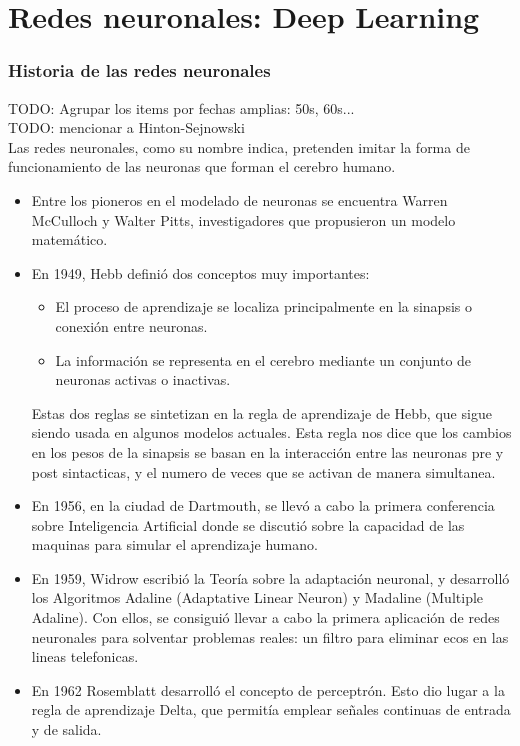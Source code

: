 \chapter{Redes neuronales: Deep Learning}
\subsection {Historia de las redes neuronales}
TODO: Agrupar los items por fechas amplias: 50s, 60s...\\
TODO: mencionar a Hinton-Sejnowski\\
Las redes neuronales, como su nombre indica, pretenden imitar la forma de funcionamiento de las neuronas que forman el cerebro humano.
\begin{itemize}
\item Entre los pioneros en el modelado de neuronas se encuentra Warren McCulloch y Walter Pitts, investigadores que propusieron un modelo matemático.
\item En 1949, Hebb definió dos conceptos muy importantes:
\begin{itemize}
\item El proceso de aprendizaje se localiza principalmente en la sinapsis o conexión entre neuronas.
\item La información se representa en el cerebro mediante un conjunto de neuronas activas o inactivas.
\end{itemize}
Estas dos reglas se sintetizan en la regla de aprendizaje de Hebb, que sigue siendo usada en algunos modelos actuales. Esta regla nos dice que los cambios en los pesos de la sinapsis se basan en la interacción entre las neuronas pre y post sintacticas, y el numero de veces que se activan de manera simultanea.
\item En 1956, en la ciudad de Dartmouth, se llevó a cabo la primera conferencia sobre Inteligencia Artificial donde se discutió sobre la capacidad de las maquinas para simular el aprendizaje humano.
\item En 1959, Widrow escribió la Teoría sobre la adaptación neuronal, y desarrolló los Algoritmos Adaline (Adaptative Linear Neuron) y Madaline (Multiple Adaline). Con ellos, se consiguió llevar a cabo la primera aplicación de redes neuronales para solventar problemas reales: un filtro para eliminar ecos en las lineas telefonicas.
\item En 1962 Rosemblatt desarrolló el concepto de perceptrón. Esto dio lugar a la regla de aprendizaje Delta, que permitía emplear señales continuas de entrada y de salida.

\end{itemize}
